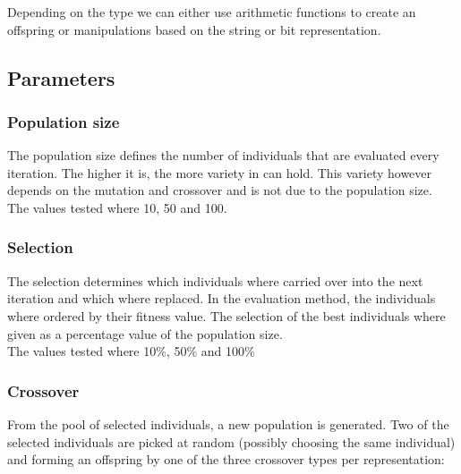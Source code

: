 \documentclass{scrartcl}
\begin{document}
Depending on the type we can either use arithmetic functions to create an offspring or manipulations based on the string or bit representation.

\subsection{Parameters}
\subsubsection{Population size}
The population size defines the number of individuals that are evaluated every iteration. The higher it is, the more variety in can hold. This variety however depends on the mutation and crossover and is not due to the population size. \\
The values tested where 10, 50 and 100. 

\subsubsection{Selection}
The selection determines which individuals where carried over into the next iteration and which where replaced. In the evaluation method, the individuals where ordered by their fitness value. The selection of the best individuals where given as a percentage value of the population size.\\
The values tested where 10\%, 50\% and  100\%

\subsubsection{Crossover}
From the pool of selected individuals, a new population is generated. Two of the selected individuals are picked at random (possibly choosing the same individual) and forming an offspring by one of the three crossover types per representation:
\end{document}
